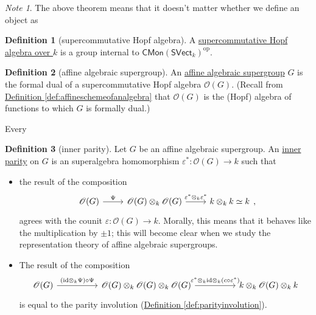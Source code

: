 \documentclass[a4paper,10pt]{scrreprt}
\newcommand{\defn}[1]{\ul{#1}}
\theoremstyle{definition}
\newtheorem{definition}{Definition}[section]
\theoremstyle{plain}
\theoremstyle{remark}
\newtheorem{note}{Note}[section]
\begin{document}
\begin{note}
  The above theorem means that it doesn't matter whether we define an object as
\end{note}

\begin{definition}[supercommutative Hopf algebra]
  \label{def:supercommutativehopfalgebra}
  A \defn{supercommutative Hopf algebra over $k$} is a group internal to $\mathsf{CMon}(\mathsf{SVect}_{k})^{\mathrm{op}}$.
\end{definition}

\begin{definition}[affine algebraic supergroup]
  \label{def:affinealgebraicsupergroup}
  An \defn{affine algebraic supergroup} $G$ is the formal dual of a supercommutative Hopf algebra $\mathscr{O}(G)$. (Recall from \hyperref[def:affineschemeofanalgebra]{Definition \ref*{def:affineschemeofanalgebra}} that $\mathscr{O}(G)$ is the (Hopf) algebra of functions to which $G$ is formally dual.)
\end{definition}

Every 

\begin{definition}[inner parity]
  \label{def:innerparity}
  Let $G$ be an affine algebraic supergroup. An \defn{inner parity} on $G$ is an superalgebra homomorphism $\varepsilon^{*}\colon \mathscr{O}(G) \to k$ such that
  \begin{itemize}
    \item the result of the composition
      \begin{equation*}
        \begin{tikzcd}
          \mathscr{O}(G) 
          \arrow[r, "\Psi"]
          & \mathscr{O}(G) \otimes_{k} \mathscr{O}(G)
          \arrow[r, "\varepsilon^{*} \otimes_{k} \varepsilon^{*}"]
          & k \otimes_{k} k \simeq k
        \end{tikzcd},
      \end{equation*}
      agrees with the counit $\varepsilon\colon \mathscr{O}(G) \to k$.
      Morally, this means that it behaves like the multiplication by $\pm 1$; this will become clear when we study the representation theory of affine algebraic supergroups.

    \item The result of the composition
      \begin{equation*}
        \begin{tikzcd}[column sep=huge]
          \mathscr{O}(G) 
          \arrow[r, "(\mathrm{id} \otimes_{k} \Psi) \circ \Psi"]
          & \mathscr{O}(G) \otimes_{k} \mathscr{O}(G) \otimes_{k} \mathscr{O}(G)
          \arrow[r, "\varepsilon^{*} \otimes_{k} \mathrm{id} \otimes_{k} (c \circ \varepsilon^{*})"]
          & k \otimes_{k} \mathscr{O}(G) \otimes_{k} k
        \end{tikzcd}
      \end{equation*}
      is equal to the parity involution (\hyperref[def:parityinvolution]{Definition \ref*{def:parityinvolution}}).
  \end{itemize}
\end{definition}
\end{document}

